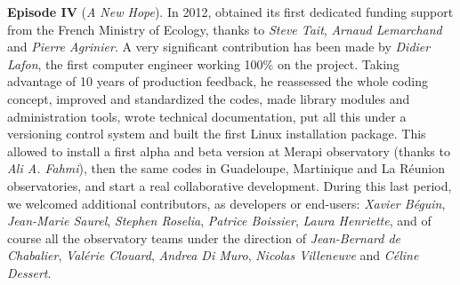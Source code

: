 \textbf{Episode IV} (\textit{A New Hope}). In 2012, \webobs obtained its first dedicated funding support from the French Ministry of Ecology, thanks to \textit{Steve Tait}, \textit{Arnaud Lemarchand} and \textit{Pierre Agrinier}. A very significant contribution has been made by \textit{Didier Lafon}, the first computer engineer working 100\% on the project. Taking advantage of 10 years of production feedback, he reassessed the whole coding concept, improved and standardized the codes, made library modules and administration tools, wrote technical documentation, put all this under a versioning control system and built the first Linux installation package. This allowed to install a first alpha and beta version at Merapi observatory (thanks to \textit{Ali A. Fahmi}), then the same codes in Guadeloupe, Martinique and La Réunion observatories, and start a real collaborative development. During this last period, we welcomed additional contributors, as developers or end-users: \textit{Xavier Béguin}, \textit{Jean-Marie Saurel}, \textit{Stephen Roselia}, \textit{Patrice Boissier}, \textit{Laura Henriette}, and of course all the observatory teams under the direction of \textit{Jean-Bernard de Chabalier}, \textit{Valérie Clouard}, \textit{Andrea Di Muro}, \textit{Nicolas Villeneuve} and \textit{Céline Dessert}.
